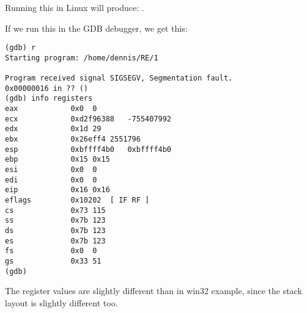 Running this in Linux will produce: .


If we run this in the GDB debugger, we get this:

\begin{lstlisting}
(gdb) r
Starting program: /home/dennis/RE/1 

Program received signal SIGSEGV, Segmentation fault.
0x00000016 in ?? ()
(gdb) info registers
eax            0x0	0
ecx            0xd2f96388	-755407992
edx            0x1d	29
ebx            0x26eff4	2551796
esp            0xbffff4b0	0xbffff4b0
ebp            0x15	0x15
esi            0x0	0
edi            0x0	0
eip            0x16	0x16
eflags         0x10202	[ IF RF ]
cs             0x73	115
ss             0x7b	123
ds             0x7b	123
es             0x7b	123
fs             0x0	0
gs             0x33	51
(gdb) 
\end{lstlisting}

The register values are slightly different than in win32 example, 
since the stack layout is slightly different too.

